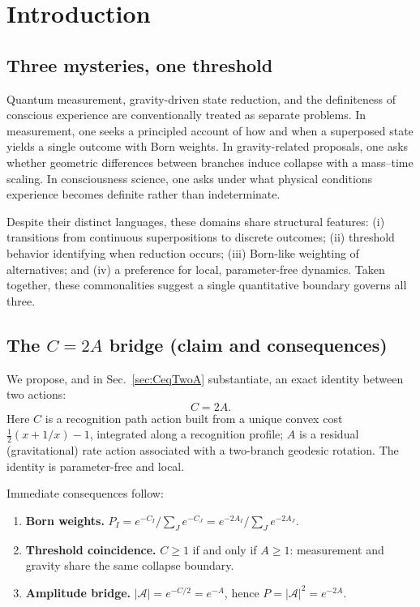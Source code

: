 \documentclass[reprint,aps,prd,nofootinbib]{revtex4-2}
\begin{document}
\maketitle



\section{Introduction}

\subsection{Three mysteries, one threshold}
Quantum measurement, gravity-driven state reduction, and the definiteness of conscious experience are conventionally treated as separate problems. In measurement, one seeks a principled account of how and when a superposed state yields a single outcome with Born weights. In gravity-related proposals, one asks whether geometric differences between branches induce collapse with a mass--time scaling. In consciousness science, one asks under what physical conditions experience becomes definite rather than indeterminate.

Despite their distinct languages, these domains share structural features: (i) transitions from continuous superpositions to discrete outcomes; (ii) threshold behavior identifying when reduction occurs; (iii) Born-like weighting of alternatives; and (iv) a preference for local, parameter-free dynamics. Taken together, these commonalities suggest a single quantitative boundary governs all three.

\subsection{The \texorpdfstring{$C=2A$}{C=2A} bridge (claim and consequences)}
We propose, and in Sec.~\ref{sec:CeqTwoA} substantiate, an exact identity between two actions:
\begin{equation}
  C = 2A.
\end{equation}
Here \(C\) is a recognition path action built from a unique convex cost \(\tfrac{1}{2}(x+1/x)-1\), integrated along a recognition profile; \(A\) is a residual (gravitational) rate action associated with a two-branch geodesic rotation. The identity is parameter-free and local.

Immediate consequences follow:
\begin{enumerate}
  \item \textbf{Born weights.} \(P_I = e^{-C_I}/\sum_J e^{-C_J} = e^{-2A_I}/\sum_J e^{-2A_J}\).
  \item \textbf{Threshold coincidence.} \(C\ge 1\) if and only if \(A\ge 1\): measurement and gravity share the same collapse boundary.
  \item \textbf{Amplitude bridge.} \(|\mathcal{A}|=e^{-C/2}=e^{-A}\), hence \(P=|\mathcal{A}|^2=e^{-2A}\).
\end{enumerate}
\end{document}
